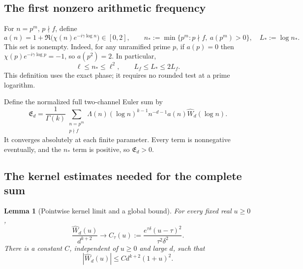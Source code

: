 \documentclass[11pt]{article}
\newtheorem{lemma}[theorem]{Lemma}
\theoremstyle{definition}
\theoremstyle{remark}
\begin{document}
\subsection{The first nonzero arithmetic frequency}

For \(n=p^m\), \(p\nmid f\), define
\begin{equation}
 a(n)=1+\Re\bigl(\chi(n)e^{-i\gamma\log n}\bigr)\in[0,2],
 \qquad n_*:=\min\{p^m:p\nmid f,\ a(p^m)>0\},\quad L_*:=\log n_*.
 \label{eq:f2v89-support}
\end{equation}
This set is nonempty.  Indeed, for any unramified prime \(p\), if
\(a(p)=0\) then \(\chi(p)e^{-i\gamma\log p}=-1\), so
\(a(p^2)=2\).  In particular,
\begin{equation}
 \ell\le n_*\le\ell^2,\qquad L_f\le L_*\le2L_f.
 \label{eq:f2v89-first-range}
\end{equation}
This definition uses the exact phase; it requires no rounded test at a
prime logarithm.

Define the normalized full two-channel Euler sum by
\begin{equation}
 \mathfrak E_d=
 \frac1{\Gamma(k)}\sum_{\substack{n=p^m\\p\nmid f}}
 \Lambda(n)(\log n)^{k-1}n^{-d-1}a(n)\widehat W_d(\log n).
 \label{eq:f2v89-Euler}
\end{equation}
It converges absolutely at each finite parameter.  Every term is
nonnegative eventually, and the \(n_*\) term is positive, so
\(\mathfrak E_d>0\).

\subsection{The kernel estimates needed for the complete sum}

\begin{lemma}[Pointwise kernel limit and a global bound]
\label{lem:f2v89-kernel}
For every fixed real \(u\ge0\),
\begin{equation}
 \frac{\widehat W_d(u)}{d^{k+2}}
 \longrightarrow C_\tau(u):=
       \frac{e^{\tau\delta}(u-\tau)^2}{\tau^2\delta^2}.
 \label{eq:f2v89-kernel-limit}
\end{equation}
There is a constant \(C\), independent of \(u\ge0\) and large \(d\),
such that
\begin{equation}
 |\widehat W_d(u)|\le C d^{k+2}(1+u)^2.
 \label{eq:f2v89-kernel-bound}
\end{equation}
\end{lemma}
\end{document}
